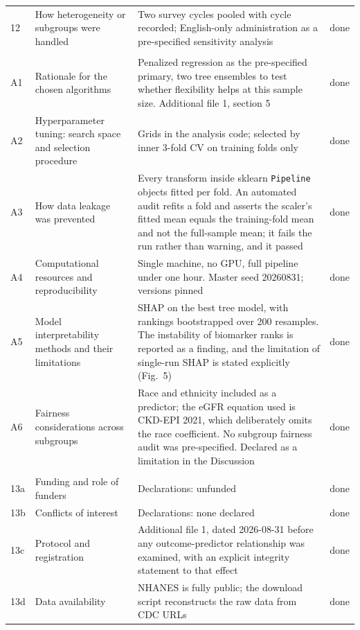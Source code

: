 \documentclass[10pt]{article}
\begin{document}
\begin{longtable}{C{0.7cm}L{4.3cm}L{9cm}C{1.2cm}}
12 & How heterogeneity or subgroups were handled & Two survey cycles pooled with cycle recorded; English-only administration as a pre-specified sensitivity analysis & done \\
\addlinespace
{} \\
A1 & Rationale for the chosen algorithms & Penalized regression as the pre-specified primary, two tree ensembles to test whether flexibility helps at this sample size. Additional file 1, section 5 & done \\
A2 & Hyperparameter tuning: search space and selection procedure & Grids in the analysis code; selected by inner 3-fold CV on training folds only & done \\
A3 & How data leakage was prevented & Every transform inside sklearn \texttt{Pipeline} objects fitted per fold. An automated audit refits a fold and asserts the scaler's fitted mean equals the training-fold mean and not the full-sample mean; it fails the run rather than warning, and it passed & done \\
A4 & Computational resources and reproducibility & Single machine, no GPU, full pipeline under one hour. Master seed 20260831; versions pinned & done \\
A5 & Model interpretability methods and their limitations & SHAP on the best tree model, with rankings bootstrapped over 200 resamples. The instability of biomarker ranks is reported as a finding, and the limitation of single-run SHAP is stated explicitly (Fig.~5) & done \\
A6 & Fairness considerations across subgroups & Race and ethnicity included as a predictor; the eGFR equation used is CKD-EPI 2021, which deliberately omits the race coefficient. No subgroup fairness audit was pre-specified. Declared as a limitation in the Discussion & done \\
\addlinespace
{} \\
13a & Funding and role of funders & Declarations: unfunded & done \\
13b & Conflicts of interest & Declarations: none declared & done \\
13c & Protocol and registration & Additional file 1, dated 2026-08-31 before any outcome-predictor relationship was examined, with an explicit integrity statement to that effect & done \\
13d & Data availability & NHANES is fully public; the download script reconstructs the raw data from CDC URLs & done \\

\end{longtable}
\end{document}
